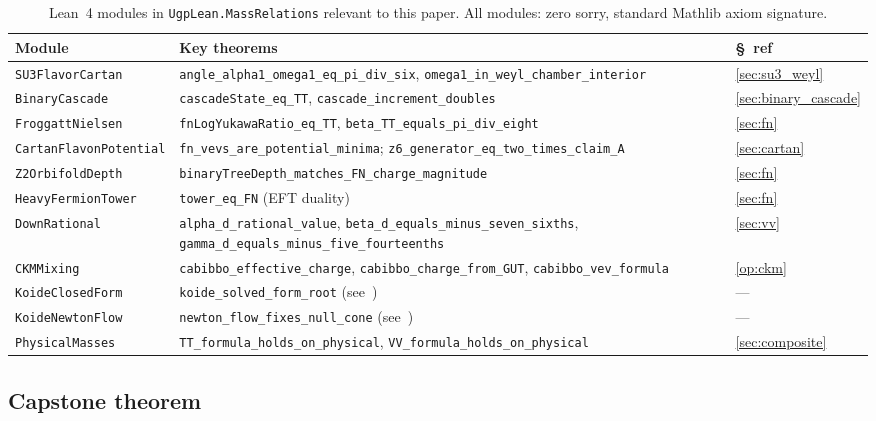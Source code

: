 \documentclass[11pt]{article}
\theoremstyle{remark}
\newcommand{\lean}[1]{\texttt{\small#1}}
\begin{document}
\begin{table}[ht]
\centering
\caption{Lean~4 modules in \texttt{UgpLean.MassRelations} relevant to this paper.
All modules: zero sorry, standard Mathlib axiom signature.}
\label{tab:lean_modules}
\footnotesize
\begin{tabular}{p{3.6cm}>{\raggedright\arraybackslash}p{8.0cm}l}
\toprule
Module & Key theorems & §~ref \\
\midrule
\lean{SU3FlavorCartan} & \lean{angle\_alpha1\_omega1\_eq\_pi\_div\_six},
  \lean{omega1\_in\_weyl\_chamber\_interior} & \ref{sec:su3_weyl} \\
\lean{BinaryCascade} & \lean{cascadeState\_eq\_TT},
  \lean{cascade\allowbreak\_increment\allowbreak\_doubles} & \ref{sec:binary_cascade} \\
\lean{FroggattNielsen} & \lean{fnLogYukawaRatio\allowbreak\_eq\_TT},
  \lean{beta\allowbreak\_TT\allowbreak\_equals\allowbreak\_pi\_div\_eight} & \ref{sec:fn} \\
\lean{Cartan\allowbreak{}FlavonPotential} & \lean{fn\_vevs\_are\_potential\_\allowbreak minima};
  \lean{z6\_generator\_eq\_\allowbreak two\_times\_claim\_A} & \ref{sec:cartan} \\
\lean{Z2OrbifoldDepth} & \lean{binaryTreeDepth\_matches\allowbreak\_FN\_charge\_magnitude} & \ref{sec:fn} \\
\lean{HeavyFermionTower} & \lean{tower\_eq\_FN} (EFT duality) & \ref{sec:fn} \\
\lean{DownRational} & \lean{alpha\_d\_rational\_value},
  \lean{beta\_d\_equals\allowbreak\_minus\_seven\_sixths},
  \lean{gamma\_d\_equals\allowbreak\_minus\_five\_fourteenths} & \ref{sec:vv} \\
\lean{CKMMixing} & \lean{cabibbo\_effective\_charge},
  \lean{cabibbo\_charge\_from\_GUT},
  \lean{cabibbo\_vev\_formula} & \ref{op:ckm} \\
\lean{KoideClosedForm} & \lean{koide\_solved\_form\_root} (see~\cite{Spivack2026_Koide}) & --- \\
\lean{KoideNewtonFlow} & \lean{newton\_flow\_fixes\_null\_cone} (see~\cite{Spivack2026_Koide}) & --- \\
\lean{PhysicalMasses} & \lean{TT\_formula\_holds\_on\_physical},
  \lean{VV\_formula\_holds\_on\_physical} & \ref{sec:composite} \\
\bottomrule
\end{tabular}
\end{table}

\subsection{Capstone theorem}
\end{document}
